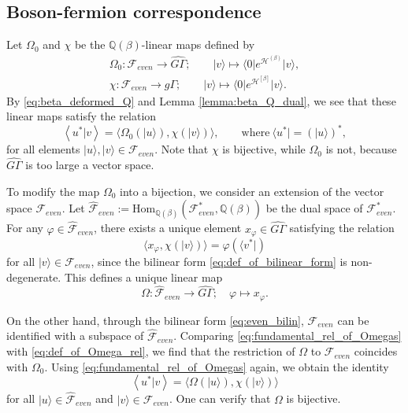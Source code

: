 \documentclass{amsart}
\def\QQ{\mathord{\mathbb{Q}}}
\def\ket#1{\vert #1 \rangle}
\def\bra#1{\langle #1 \vert}
\def\inner#1#2{\left\langle #1|#2\right\rangle}
\begin{document}
\subsection{Boson-fermion correspondence}
\label{sec:boson_fermion}




Let $\Omega_0$ and $\chi$ be the $\QQ(\beta)$-linear maps defined by
\[
\begin{gathered}
\Omega_0:\mathcal{F}_{even}\to \widehat{G\Gamma};\qquad \ket{v}\mapsto \bra{0}e^{\mathcal{H}^{(\beta)}}\ket{v},\\
\chi:\mathcal{F}_{even}\to g\Gamma;\qquad \ket{v}\mapsto \bra{0}e^{\mathcal{H}^{[\beta]}}\ket{v}.
\end{gathered}
\]
By \eqref{eq:beta_deformed_Q} and Lemma \ref{lemma:beta_Q_dual}, we see that these linear maps satisfy the relation
\begin{equation}\label{eq:fundamental_rel_of_Omegas}
\inner{u^\ast}{v}=
\big\langle \Omega_0(\ket{u}), \chi(\ket{v}) \big\rangle
, \qquad\text{where}\ \bra{u^\ast}=(\ket{u})^\ast,
\end{equation}
for all elements $\ket{u},\ket{v}\in \mathcal{F}_{even}$.
Note that $\chi$ is bijective, while $\Omega_0$ is not, because $\widehat{G\Gamma}$ is too large a vector space.

To modify the map $\Omega_0$ into a bijection, we consider an extension of the vector space $\mathcal{F}_{even}$.
Let $\widehat{\mathcal{F}}_{even}:=
\mathrm{Hom}_{\QQ(\beta)}(\mathcal{F}^\ast_{even},\QQ(\beta))
$ be the dual space of $\mathcal{F}^\ast_{even}$.
For any $\varphi\in \widehat{\mathcal{F}}_{even}$,
there exists a unique element $x_\varphi\in \widehat{G\Gamma}$ satisfying the relation
\begin{equation}\label{eq:def_of_Omega_rel}
\big\langle
x_\varphi,\chi(\ket{v})
\big\rangle=
\varphi(\bra{v^\ast})
\end{equation}
for all $\ket{v}\in\mathcal{F}_{even}$, since the bilinear form \eqref{eq:def_of_bilinear_form} is non-degenerate.
This defines a unique linear map
\[
\Omega:\widehat{\mathcal{F}}_{even}\to \widehat{G\Gamma};\quad \varphi\mapsto x_\varphi.
\] 

On the other hand, through the bilinear form \eqref{eq:even_bilin}, $\mathcal{F}_{even}$ can be identified with a subspace of $\widehat{\mathcal{F}}_{even}$.
Comparing \eqref{eq:fundamental_rel_of_Omegas} with \eqref{eq:def_of_Omega_rel}, we find that the restriction of $\Omega$ to $\mathcal{F}_{even}$ coincides with $\Omega_0$.
Using \eqref{eq:fundamental_rel_of_Omegas} again, we obtain the identity
\begin{equation}\label{eq:inner_pres}
\inner{u^\ast}{v}=
\big\langle \Omega(\ket{u}), \chi(\ket{v}) \big\rangle
\end{equation}
for all $\ket{u}\in \widehat{\mathcal{F}}_{even}$ and $\ket{v}\in \mathcal{F}_{even}$.
One can verify that $\Omega$ is bijective.
\end{document}
